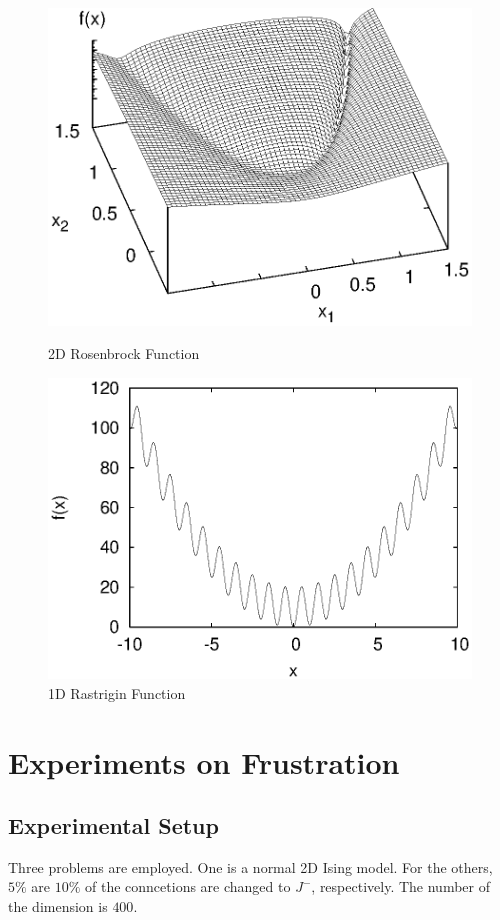 \begin{figure}[tbp]
\centerline{
\includegraphics[width=\figlength\linewidth]{./data_aexp/rosenbrock.eps}}
\caption{2D Rosenbrock Function}
\label{fig-rosenbrock}

\vspace{\figskiplength}

\centerline{
\includegraphics[width=\figlength\linewidth]{./data_aexp/rastrigin.eps}}
\caption{1D Rastrigin Function}
\label{fig-rastrigin}
\end{figure}


\section{Experiments on Frustration}
\subsection{Experimental Setup}
Three problems are employed.
One is a normal 2D Ising model.
For the others, $5\%$ are $10\%$ of the conncetions
are changed to $J^-$, respectively.
The number of the dimension is $400$.

